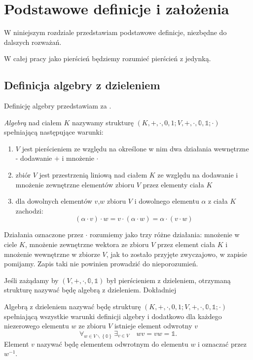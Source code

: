 

\chapter{Podstawowe definicje i założenia}
W niniejszym rozdziale przedstawiam podstawowe definicje, niezbędne do dalszych
rozważań.

W całej pracy jako pierścień będziemy rozumieć pierścień z jedynką.

\section{Definicja algebry z dzieleniem}
Definicję algebry przedstawiam za \cite{opial}.
\begin{definicja}
 \textit{Algebrą} nad ciałem $K$ nazywamy strukturę $(K,+,\cdot,0,
1;V,+,\cdot,\mathbb{0},\mathbb{1};\cdot )$ spełniającą następujące warunki:
\begin{enumerate}
 \item $V$ jest pierścieniem ze względu na określone w nim dwa działania
wewnętrzne - dodawanie $+$ i mnożenie $\cdot$
 \item zbiór $V$ jest przestrzenią liniową nad ciałem $K$ ze względu na
dodawanie i mnożenie zewnętrzne elementów zbioru $V$ przez elementy ciała $K$
 \item dla dowolnych elementów $v$,$w$ zbioru $V$ i dowolnego elementu $\alpha$
z ciała $K$ zachodzi: 
\begin{equation}
(\alpha \cdot v) \cdot w=v \cdot (\alpha \cdot w)=\alpha \cdot (v \cdot w) 
\label{warunek:pslacznosc}
\end{equation}
\end{enumerate}
\end{definicja}
Działania oznaczone przez $\cdot$ rozumiemy jako trzy różne działania: mnożenie
w ciele $K$, mnożenie zewnętrzne wektora ze zbioru $V$ przez element ciała $K$ i
mnożenie wewnętrzne w zbiorze $V$, jak to zostało przyjęte zwyczajowo, w
zapisie pomijamy. Zapis taki nie powinien prowadzić do nieporozumień.

Jeśli zażądamy by $(V,+,\cdot,\mathbb{0},\mathbb{1})$ był pierścieniem z
dzieleniem, otrzymaną strukturę nazywać będę algebrą z dzieleniem. Dokładniej
\begin{definicja}
 Algebrą z dzieleniem nazywać będę strukturę
$(K,+,\cdot,0,1;V,+,\cdot,\mathbb{0},\mathbb{1};\cdot )$ spełniającą wszystkie
warunki
definicji algebry i dodatkowo dla każdego niezerowego elementu $w$ ze zbioru $V$
istnieje
element odwrotny $v$ 
\begin{equation}
\forall_{w\in V \backslash \left\lbrace \mathbb{0} \right\rbrace } \,
\exists_{v\in V} \quad 
wv=vw=\mathbb{1}.
\label{warunek:elementodwrotny}
\end{equation}
Element $v$ nazywać będę elementem odwrotnym do elementu $w$ i oznaczać przez
$w^{-1}$.
\end{definicja}

